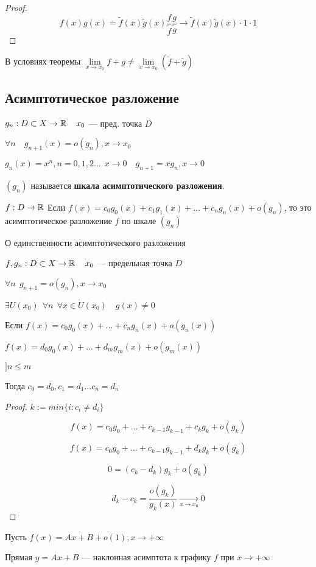     \begin{proof}
        $$f(x)g(x) = \tilde f(x)\tilde g(x)\frac{f}{\tilde f}\frac{g}{\tilde g}\to \tilde f(x)\tilde g(x) \cdot 1\cdot 1$$
    \end{proof}
    \begin{remark}
        В условиях теоремы $\lim\limits_{x\to x_0} f+g\not=\lim\limits_{x\to x_0} (\tilde f + \tilde g)$
    \end{remark}
    \subsection{Асимптотическое разложение}

    \begin{definition}
        $g_n:D\subset X\to\operatorname*{\mathbb{R}} \quad x_0$ --- пред. точка $D$

        $\forall n \quad g_{n+1}(x)=o(g_n), x\to x_0$

        \begin{example}
            $g_n(x)=x^n, n=0,1,2\ldots \ \ x\to 0 \quad g_{n+1}=xg_n, x\to 0$
        \end{example}

        $(g_n)$ называется \textbf{шкала асимптотического разложения}.
        
        $f:D\to\operatorname*{\mathbb{R}}$ Если $f(x)=c_0g_0(x)+c_1g_1(x)+\ldots+c_ng_n(x)+o(g_n)$, то это асимптотическое разложение $f$ по шкале $(g_n)$
    \end{definition}
    \begin{theorem}
        О единственности асимптотического разложения

        $f, g_n: D\subset X\to \operatorname*{\mathbb{R}} \quad x_0$ --- предельная точка $D$

        $\forall n \ \ g_{n+1}=o(g_n), x\to x_0$

        $\exists U(x_0) \ \ \forall n \ \ \forall x\in\dot U(x_0) \quad g(x)\not=0$

        Если $f(x)=c_0g_0(x)+\ldots+c_ng_n(x)+o(g_n(x))$

        $f(x)=d_0g_0(x)+\ldots+d_mg_m(x)+o(g_m(x))$

        $] n\leq m$

        Тогда $c_0=d_0, c_1=d_1 \ldots c_n=d_n$
    \end{theorem}
    \begin{proof}
        $k:=min\{i:c_i\not=d_i\}$

        $$f(x)=c_0g_0+\ldots+c_{k-1}g_{k-1}+c_kg_k+o(g_k)$$

        $$f(x)=c_0g_0+\ldots+c_{k-1}g_{k-1}+d_kg_k+o(g_k)$$

        $$0=(c_k-d_k)g_k+o(g_k)$$

        $$d_k-c_k=\frac{o(g_k)}{g_k(x)}\xrightarrow[x\to x_0]{}0$$
    \end{proof}
    \begin{example}
        Пусть $f(x)=Ax+B+o(1), x\to +\infty$

        Прямая $y=Ax+B$ --- наклонная асимптота к графику $f$ при $x\to +\infty$
    \end{example}
